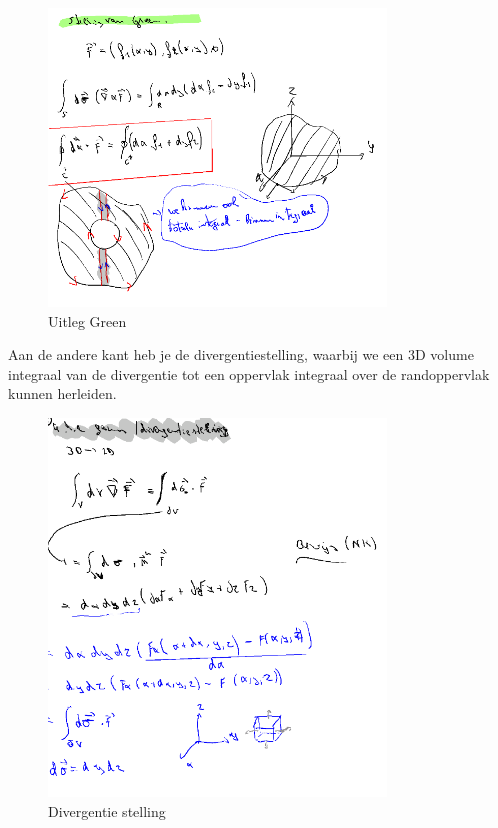 \documentclass[a4paper]{report}
\begin{document}
\begin{figure}[H]
	\centering
	\includegraphics[width=0.8\textwidth]{assets/uitleg_green.png}
	\caption{Uitleg Green}
	\label{fig:uitleg_green}
\end{figure}


Aan de andere kant heb je de divergentiestelling, waarbij we een 3D volume integraal van de divergentie tot een oppervlak integraal over de randoppervlak kunnen herleiden.

\begin{figure}[H]
	\centering
	\includegraphics[width=0.8\textwidth]{assets/divergentie_stelling.png}
	\caption{Divergentie stelling}
	\label{fig:divergentie_stelling}
\end{figure}
\end{document}
